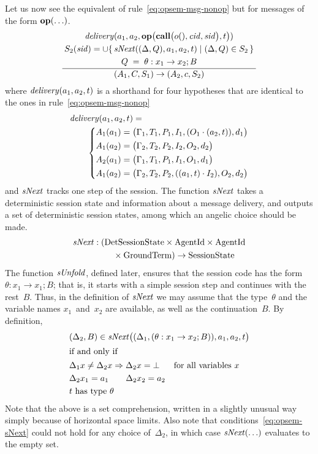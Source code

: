 \documentclass[a4paper,12pt,oneside,fleqn]{book} %
\newcommand{\limp}{\Rightarrow}
\newcommand{\on}[2]{\genfrac{}{}{0pt}{0}{\strut#1}{\strut#2}}
\begin{document}
Let us now see the equivalent of rule~\eqref{eq:opsem-msg-nonop} but for
messages of the form ${\bf op}(\ldots)$.
\begin{align}
\frac
  {\on{{\it delivery}(a_1,a_2,
    {\bf op}\bigl({\bf call}\bigl(o(),{\it cid},{\it sid}\bigr),t\bigr))}
  {\on{S_2({\it sid})=
        \cup\{\,{\it sNext}((\Delta,Q),a_1,a_2,t)
          \mid(\Delta,Q)\in S_2\,\}}
      {Q\;=\;\theta:x_1\to x_2; B}}}
  {(A_1,C,S_1)\to(A_2,c,S_2)}
\end{align}
where ${\it delivery}(a_1,a_2,t)$ is a shorthand for four hypotheses
that are identical to the ones in rule~\eqref{eq:opsem-msg-nonop}
\begin{align}
\begin{aligned}
&{\it delivery}(a_1,a_2,t) = \\
  &\qquad
  \left\{
  \begin{aligned}
  A_1(a_1)&=\bigl(\Gamma_1,T_1,P_1,I_1,(O_1\cdot(a_2,t)),d_1\bigr) \\
  A_1(a_2)&=\bigl(\Gamma_2,T_2,P_2,I_2,O_2,d_2\bigr) \\
  A_2(a_1)&=\bigl(\Gamma_1,T_1,P_1,I_1,O_1,d_1\bigr) \\
  A_1(a_2)&=\bigl(\Gamma_2,T_2,P_2,((a_1,t)\cdot I_2),O_2,d_2\bigr)
  \end{aligned}
  \right.
\end{aligned}
\end{align}
and $\it sNext$ tracks one step of the session. The function $\it sNext$
takes a deterministic session state and information about a message
delivery, and outputs a set of deterministic session states, among which an
angelic choice should be made.
\begin{align}
\begin{aligned}
{\it sNext} :
  (&{\rm DetSessionState}\times{\rm AgentId}\times{\rm AgentId}
\\
&\quad\times{\rm GroundTerm}) \to {\rm SessionState}
\end{aligned}
\end{align}
The function $\it sUnfold$, defined later, ensures that the session code
has the form $\theta:x_1\to x_1; B$; that is, it starts with a simple
session step and continues with the rest~$B$. Thus, in the definition of
$\it sNext$ we may assume that the type~$\theta$ and the variable names
$x_1$~and~$x_2$ are available, as well as the continuation~$B$. By
definition,
\begin{align}
&(\Delta_2,B) \in {\it sNext}\bigl((\Delta_1,(\theta:x_1\to x_2;B)),a_1,a_2,t\bigr) \\
\intertext{if and only if}
&\begin{aligned}
&\Delta_1x\ne\Delta_2x \limp \Delta_2x=\bot
  &&\text{for all variables $x$} \\
&\Delta_2 x_1=a_1 \qquad \Delta_2 x_2=a_2\\
&\text{$t$ has type $\theta$}
\end{aligned}\label{eq:opsem-sNext}
\end{align}
Note that the above is a set comprehension, written in a slightly unusual
way simply because of horizontal space limits. Also note that
conditions~\eqref{eq:opsem-sNext} could not hold for any choice
of~$\Delta_2$, in which case ${\it sNext}(\ldots)$ evaluates to the empty
set.
\end{document}
